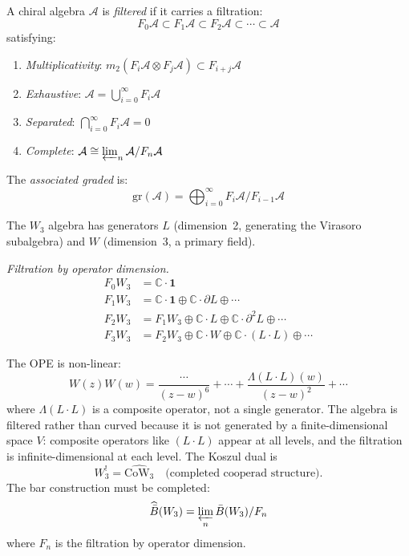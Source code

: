 \begin{definition}\label{def:filtered-chiral}
A chiral algebra $\mathcal{A}$ is \emph{filtered} if it carries a filtration:
\begin{equation}
F_0\mathcal{A} \subset F_1\mathcal{A} \subset F_2\mathcal{A} \subset \cdots \subset \mathcal{A}
\end{equation}
satisfying:
\begin{enumerate}
\item \emph{Multiplicativity}: $m_2(F_i\mathcal{A} \otimes F_j\mathcal{A}) \subset F_{i+j}\mathcal{A}$
\item \emph{Exhaustive}: $\mathcal{A} = \bigcup_{i=0}^\infty F_i\mathcal{A}$
\item \emph{Separated}: $\bigcap_{i=0}^\infty F_i\mathcal{A} = 0$
\item \emph{Complete}: $\mathcal{A} \cong \varprojlim_n \mathcal{A}/F_n\mathcal{A}$
\end{enumerate}

The \emph{associated graded} is:
\begin{equation}
\text{gr}(\mathcal{A}) = \bigoplus_{i=0}^\infty F_i\mathcal{A}/F_{i-1}\mathcal{A}
\end{equation}
\end{definition}

\begin{example}\label{ex:w3-filtered}
The $W_3$ algebra has generators $L$ (dimension~2, generating the Virasoro subalgebra) and $W$ (dimension~3, a primary field).

\emph{Filtration by operator dimension.}
\begin{align}
F_0W_3 &= \mathbb{C} \cdot \mathbf{1} \\
F_1W_3 &= \mathbb{C} \cdot \mathbf{1} \oplus \mathbb{C} \cdot \partial L \oplus \cdots \\
F_2W_3 &= F_1W_3 \oplus \mathbb{C} \cdot L \oplus \mathbb{C} \cdot \partial^2 L \oplus \cdots \\
F_3W_3 &= F_2W_3 \oplus \mathbb{C} \cdot W \oplus \mathbb{C} \cdot (L \cdot L) \oplus \cdots
\end{align}

The OPE is non-linear:
\[W(z)W(w) = \frac{\cdots}{(z-w)^6} + \cdots + \frac{\Lambda(L \cdot L)(w)}{(z-w)^2} + \cdots\]
where $\Lambda(L \cdot L)$ is a composite operator, not a single generator. The algebra is filtered rather than curved because it is not generated by a finite-dimensional space $V$: composite operators like $(L \cdot L)$ appear at all levels, and the filtration is infinite-dimensional at each level. The Koszul dual is
\[W_3^! = \widehat{\mathrm{CoW}_3}
\quad \text{(completed cooperad structure)}.\]
The bar construction must be completed:
\[\widehat{\bar{B}}(W_3) = \varprojlim_n \bar{B}(W_3)/F_n\]
where $F_n$ is the filtration by operator dimension.
\end{example}


